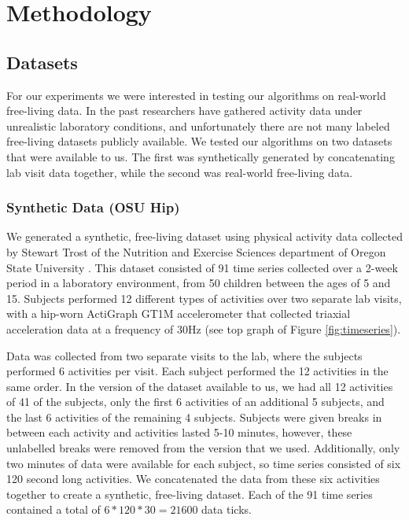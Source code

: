 \chapter{Methodology}

\section{Datasets}
For our experiments we were interested in testing our algorithms on real-world free-living
data. In the past researchers have gathered activity data under unrealistic
laboratory conditions, and unfortunately there are not many labeled free-living
datasets publicly available. We tested our algorithms on two datasets that were
available to us. The first was synthetically generated by concatenating lab
visit data together, while the second was real-world free-living data.

\subsection{Synthetic Data (OSU Hip)}
We generated a synthetic, free-living dataset using physical activity data
collected by Stewart Trost of the Nutrition and Exercise Sciences department of
Oregon State University \cite{trost12} \cite{zheng12}.
This dataset consisted of 91 time series collected over a 2-week period in a
laboratory environment, from 50 children between the ages of 5 and 15. Subjects
performed 12 different types of activities  over two separate lab visits, with
a hip-worn ActiGraph GT1M accelerometer that collected triaxial acceleration
data at a frequency of 30Hz (see top graph of Figure \ref{fig:timeseries}).

Data was collected from two separate visits to the lab, where the subjects performed 6 activities per visit.
Each subject performed the 12 activities in the same order.
In the version of the dataset available to us, we had all 12 activities of
41 of the subjects, only the first 6 activities of an additional 5 subjects,
and the last 6 activities of the remaining 4 subjects.
Subjects were given breaks in between each activity and activities lasted 5-10
minutes, however, these unlabelled breaks were removed from the version that we
used. Additionally, only two minutes of data were available for each subject, so 
time series consisted of six 120 second long activities. We concatenated the
data from these six activities together to create a synthetic, free-living dataset. 
Each of the 91 time series contained a total of $6*120*30 = 21600$ data ticks.


